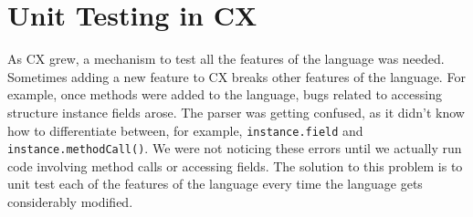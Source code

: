 \documentclass[11pt,fleqn,openany]{book} %
\begin{document}


\chapter{Unit Testing in CX}
\label{chapter:unit-testing-in-cx}


As CX grew, a mechanism to test all the features of the language was needed. Sometimes adding a new feature to CX breaks other features of the language. For example, once methods were added to the language, bugs related to accessing structure instance fields arose. The parser was getting confused, as it didn't know how to differentiate between, for example, \lstinline{instance.field} and \lstinline{instance.methodCall()}. We were not noticing these errors until we actually run code involving method calls or accessing fields. The solution to this problem is to unit test each of the features of the language every time the language gets considerably modified.
\end{document}
